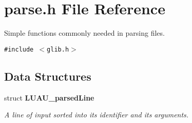 \section{parse.h File Reference}
\label{parse_8h}
Simple functions commonly needed in parsing files.  


{\tt \#include $<$glib.h$>$}\par
\subsection*{Data Structures}
\begin{CompactItemize}
\item 
struct {\bf LUAU\_\-parsed\-Line}
\begin{CompactList}\small\item\em A line of input sorted into its identifier and its arguments. \item\end{CompactList}\end{CompactItemize}
